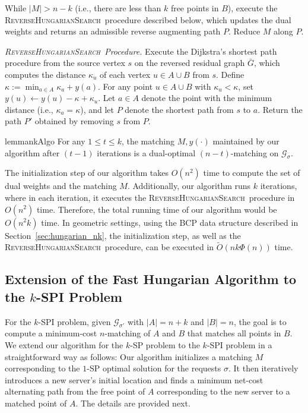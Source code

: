\documentclass[11pt,onecolumn]{article}
\def\mcG{{\mathcal{G}}}
\newcommand{\requests}{\sigma}
\newcommand{\reverse}{\textsc{ReverseHungarianSearch}}
\begin{document}
While $|M|>n-k$ (i.e., there are less than $k$ free points in $B$), execute the \reverse\ procedure described below, which updates the dual weights and returns an admissible reverse augmenting path $P$. Reduce $M$ along $P$. 

{\it \reverse\ Procedure.} Execute the Dijkstra's shortest path procedure from the source vertex $s$ on the reversed residual graph $\bar{G}$, which computes the distance $\kappa_u$ of each vertex $u\in A\cup B$ from $s$. Define $\kappa:=\min_{a\in A} \kappa_a + y(a)$. For any point $u\in A\cup B$ with $\kappa_u<\kappa$, set $y(u)\leftarrow y(u)-\kappa+\kappa_u$. Let $a\in A$ denote the point with the minimum distance (i.e., $\kappa_a=\kappa$), and let $P$ denote the shortest path from $s$ to $a$. Return the path $P'$ obtained by removing $s$ from $P$.




\begin{restatable}{lemma}{nkAlgo}\label{lemma:nkAlgo}
    For any $1\le t\le k$, the matching $M, y(\cdot)$ maintained by our algorithm after $(t-1)$ iterations is a dual-optimal $(n-t)$-matching on $\mcG_\requests$.
\end{restatable}


The initialization step of our algorithm takes $O(n^2)$ time to compute the set of dual weights and the matching $M$. Additionally, our algorithm runs $k$ iterations, where in each iteration, it executes the \reverse\ procedure in $O(n^2)$ time. Therefore, the total running time of our algorithm would be $O(n^2k)$ time. In geometric settings, using the BCP data structure described in Section~\ref{sec:hungarian_nk}, the initialization step, as well as the \reverse\ procedure, can be executed in $\tilde{O}(nk\Phi(n))$ time.


\subsection{Extension of the Fast Hungarian Algorithm to the \texorpdfstring{$k$}{}-SPI Problem} 
For the $k$-SPI problem, given $\mcG_{\requests'}$ with $|A|=n+k$ and $|B|=n$, the goal is to compute a minimum-cost $n$-matching of $A$ and $B$ that matches all points in $B$. We extend our algorithm for the $k$-SP problem to the $k$-SPI problem in a straightforward way as follows: Our algorithm initializes a matching $M$ corresponding to the $1$-SP optimal solution for the requests $\requests$. It then iteratively introduces a new server's initial location and finds a minimum net-cost alternating path from the free point of $A$ corresponding to the new server to a matched point of $A$. The details are provided next.
\end{document}
